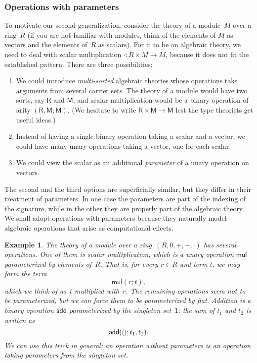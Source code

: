 \documentclass{amsart}
\newcommand{\one}{\mathsf{1}} %
\newcommand{\unit}{{\text{\small$()$}}} %
\newtheorem{example}{Example}[section]
\begin{document}
\subsubsection{Operations with parameters}
\label{sec:oper-with-param}

To motivate our second generalization, consider the theory of a module~$M$ over
a ring~$R$ (if you are not familiar with modules, think of the elements of $M$
as vectors and the elements of~$R$ as scalars). For it to be an algebraic
theory, we need to deal with scalar multiplication ${\cdot} : R \times M \to M$,
because it does not fit the established pattern. There are three possibilities:
%
\begin{enumerate}
\item We could introduce \emph{multi-sorted} algebraic theories whose operations
  take arguments from several carrier sets. The theory of a module would have
  two sorts, say $\mathsf{R}$ and $\mathsf{M}$, and scalar multiplication would
  be a binary operation of arity $(\mathsf{R}, \mathsf{M}; \mathsf{M})$. (We
  hesitate to write $\mathsf{R} \times \mathsf{M} \to \mathsf{M}$ lest the type
  theorists get useful ideas.)
\item Instead of having a single binary operation taking a scalar and a vector,
  we could have many unary operations taking a vector, one for each scalar.
\item We could view the scalar as an additional \emph{parameter} of a
  unary operation on vectors.
\end{enumerate}
%
The second and the third options are superficially similar, but they differ in
their treatment of parameters. In one case the parameters are part of the
indexing of the signature, while in the other they are properly part of the
algebraic theory. We shall adopt operations with parameters because they
naturally model algebraic operations that arise as computational effects.

\begin{example}
  The theory of a module over a ring~$(R, 0, {+}, {-}, {\cdot})$ has several
  operations. One of them is scalar multiplication, which is a \emph{unary}
  operation $\mathsf{mul}$ parameterized by elements of~$R$. That is, for every
  $r \in R$ and term $t$, we may form the term
  \begin{equation*}
    \mathsf{mul}(r; t),
  \end{equation*}
  which we think of as~$t$ multiplied with~$r$. The remaining operations seem
  not to be parameterized, but we can force them to be parameterized by fiat.
  Addition is a binary operation $\mathsf{add}$ parameterized by the singleton
  set~$\one$: the sum of $t_1$ and $t_2$ is written as
  \begin{equation*}
    \mathsf{add}(\unit; t_1, t_2).
  \end{equation*}
  We can use this trick in general: an operation without parameters is an
  operation taking parameters from the singleton set.
\end{example}
\end{document}
